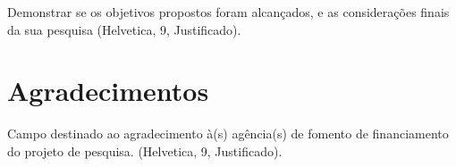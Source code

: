 \documentclass[a4paper,10pt]{article} %
\begin{document}
Demonstrar se os objetivos propostos foram alcançados, e as considerações finais da sua pesquisa (Helvetica, 9, Justificado).

\section*{Agradecimentos}

Campo destinado ao agradecimento à(s) agência(s) de fomento de financiamento do projeto de pesquisa. (Helvetica, 9, Justificado).




\end{document}
